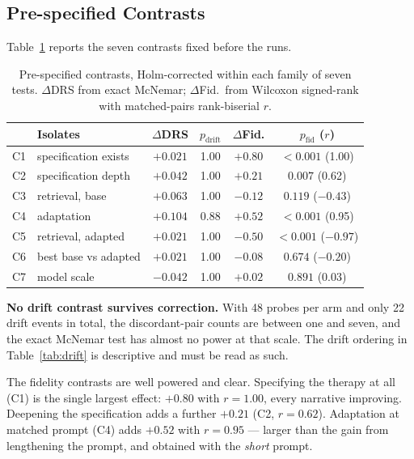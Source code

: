 \documentclass[conference]{IEEEtran}
\begin{document}
\subsection{Pre-specified Contrasts}

Table~\ref{tab:contrasts} reports the seven contrasts fixed before the runs.

\begin{table}[!t]
\caption{Pre-specified contrasts, Holm-corrected within each family of seven
tests. $\Delta$DRS from exact McNemar; $\Delta$Fid.\ from Wilcoxon signed-rank
with matched-pairs rank-biserial $r$.}
\label{tab:contrasts}
\centering
\footnotesize
\begin{tabular}{@{}llcccc@{}}
\toprule
 & \textbf{Isolates} & $\Delta$\textbf{DRS} & $p_{\mathrm{drift}}$ & $\Delta$\textbf{Fid.} & $p_{\mathrm{fid}}$ ($r$) \\
\midrule
C1 & specification exists   & $+0.021$ & 1.00 & $+0.80$ & $<0.001$ (1.00) \\
C2 & specification depth    & $+0.042$ & 1.00 & $+0.21$ & $0.007$ (0.62) \\
C3 & retrieval, base        & $+0.063$ & 1.00 & $-0.12$ & $0.119$ ($-0.43$) \\
C4 & adaptation             & $+0.104$ & 0.88 & $+0.52$ & $<0.001$ (0.95) \\
C5 & retrieval, adapted     & $+0.021$ & 1.00 & $-0.50$ & $<0.001$ ($-0.97$) \\
C6 & best base vs adapted   & $+0.021$ & 1.00 & $-0.08$ & $0.674$ ($-0.20$) \\
C7 & model scale            & $-0.042$ & 1.00 & $+0.02$ & $0.891$ (0.03) \\
\bottomrule
\end{tabular}
\end{table}

\textbf{No drift contrast survives correction.} With 48 probes per arm and only
22 drift events in total, the discordant-pair counts are between one and seven,
and the exact McNemar test has almost no power at that scale. The drift ordering
in Table~\ref{tab:drift} is descriptive and must be read as such.

The fidelity contrasts are well powered and clear. Specifying the therapy at all
(C1) is the single largest effect: $+0.80$ with $r = 1.00$, every narrative
improving. Deepening the specification adds a further $+0.21$ (C2, $r = 0.62$).
Adaptation at matched prompt (C4) adds $+0.52$ with $r = 0.95$ --- larger than
the gain from lengthening the prompt, and obtained with the \emph{short} prompt.
\end{document}
